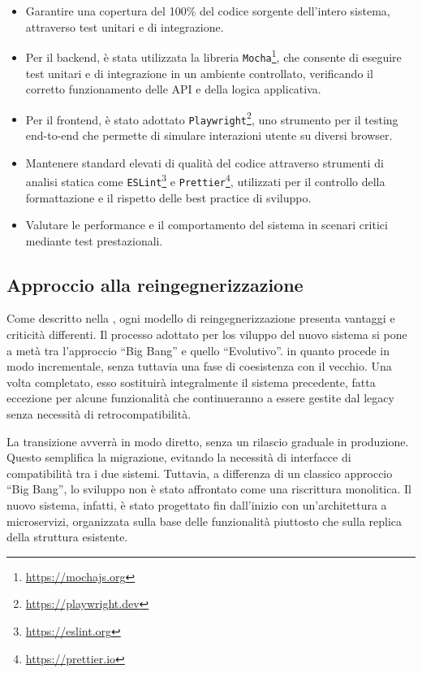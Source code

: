 \begin{itemize}
  \item Garantire una copertura del 100\% del codice sorgente dell'intero sistema, attraverso test unitari e di integrazione.
  \item Per il backend, è stata utilizzata la libreria \texttt{Mocha}\footnote{\url{https://mochajs.org}}, che consente di eseguire test unitari e di integrazione in un ambiente controllato, verificando il corretto funzionamento delle API e della logica applicativa.
  \item Per il frontend, è stato adottato \texttt{Playwright}\footnote{\url{https://playwright.dev}}, uno strumento per il testing end-to-end che permette di simulare interazioni utente su diversi browser.
  \item Mantenere standard elevati di qualità del codice attraverso strumenti di analisi statica come \texttt{ESLint}\footnote{\url{https://eslint.org}} e \texttt{Prettier}\footnote{\url{https://prettier.io}}, utilizzati per il controllo della formattazione e il rispetto delle best practice di sviluppo.
  \item Valutare le performance e il comportamento del sistema in scenari critici mediante test prestazionali.
\end{itemize}

\subsection{Approccio alla reingegnerizzazione}
Come descritto nella , ogni modello di reingegnerizzazione presenta vantaggi e criticità differenti. Il processo adottato per los viluppo del nuovo sistema si pone a metà tra l'approccio ``Big Bang'' e quello ``Evolutivo''. in quanto procede in modo incrementale, senza tuttavia una fase di coesistenza con il vecchio. Una volta completato, esso sostituirà integralmente il sistema precedente, fatta eccezione per alcune funzionalità che continueranno a essere gestite dal legacy senza necessità di retrocompatibilità.

La transizione avverrà in modo diretto, senza un rilascio graduale in produzione. Questo semplifica la migrazione, evitando la necessità di interfacce di compatibilità tra i due sistemi. Tuttavia, a differenza di un classico approccio ``Big Bang'', lo sviluppo non è stato affrontato come una riscrittura monolitica. Il nuovo sistema, infatti, è stato progettato fin dall'inizio con un'architettura a microservizi, organizzata sulla base delle funzionalità piuttosto che sulla replica della struttura esistente.

